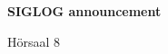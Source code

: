 \documentclass[a4paper]{article}
\begin{document}
\printGenericVSLHeader
\begin{center}
\begin{vsltext}{2.5cm}{4cm}

   \vspace{0.5cm} 

    \textbf{SIGLOG announcement} 

    \vspace{1.5cm}

    Hörsaal 8 

\end{vsltext}

\end{center}
\end{document}
